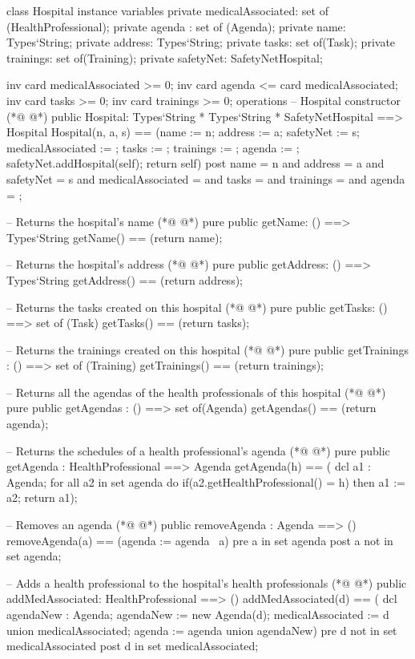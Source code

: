 \begin{vdmpp}[breaklines=true]
class Hospital
instance variables
  private medicalAssociated: set of (HealthProfessional);
  private agenda : set of (Agenda);
  private name: Types`String;
  private address: Types`String;
  private tasks: set of(Task);
  private trainings: set of(Training);
  private safetyNet: SafetyNetHospital;
 
 inv card medicalAssociated >= 0;
 inv card agenda <= card medicalAssociated;
 inv card tasks >= 0;
 inv card trainings >= 0;
operations
 -- Hospital constructor
(*@
\label{Hospital:17}
@*)
 public Hospital: Types`String * Types`String * SafetyNetHospital ==> Hospital
  Hospital(n, a, s) == (name := n; address := a; safetyNet := s; medicalAssociated := {}; tasks := {}; trainings := {}; agenda := {};
  safetyNet.addHospital(self); return self)
 post name = n and address = a and safetyNet = s and medicalAssociated = {} and tasks = {} and trainings = {} and agenda = {};
 
 -- Returns the hospital's name
(*@
\label{getName:23}
@*)
 pure public getName: () ==> Types`String
  getName() == (return name);
  
 -- Returns the hospital's address
(*@
\label{getAddress:27}
@*)
 pure public getAddress: () ==> Types`String
  getAddress() == (return address);
 
 -- Returns the tasks created on this hospital
(*@
\label{getTasks:31}
@*)
 pure public getTasks: () ==> set of (Task)
  getTasks() == (return tasks);
 
 -- Returns the trainings created on this hospital
(*@
\label{getTrainings:35}
@*)
 pure public getTrainings : () ==> set of (Training)
  getTrainings() == (return trainings);
 
 -- Returns all the agendas of the health professionals of this hospital
(*@
\label{getAgendas:39}
@*)
 pure public getAgendas : () ==> set of(Agenda)
  getAgendas() == (return agenda);
 
 -- Returns the schedules of a health professional's agenda
(*@
\label{getAgenda:43}
@*)
 pure public getAgenda : HealthProfessional ==> Agenda
  getAgenda(h) == (
   dcl a1 : Agenda;
   for all a2 in set agenda do
    if(a2.getHealthProfessional() = h)
     then a1 := a2;
   return a1);
 
 -- Removes an agenda
(*@
\label{removeAgenda:52}
@*)
 public removeAgenda : Agenda ==> ()
  removeAgenda(a) == (agenda := agenda \ {a})
 pre a in set agenda
 post a not in set agenda;
 
 -- Adds a health professional to the hospital's health professionals
(*@
\label{addMedAssociated:58}
@*)
 public addMedAssociated: HealthProfessional ==> ()
  addMedAssociated(d) == (
   dcl agendaNew : Agenda;
   agendaNew := new Agenda(d);
   medicalAssociated := {d} union medicalAssociated;
   agenda := agenda union {agendaNew})
 pre d not in set medicalAssociated
 post d in set medicalAssociated;
 

\end{vdmpp}
